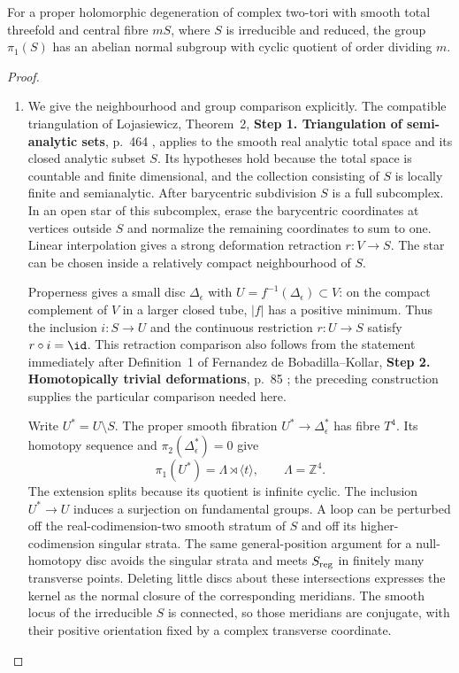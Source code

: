 \begin{proposition}[P4R.1]\hypertarget{tag-02Y2}{}\label{night:P4R.1}\label{stmt:P4R.1}

For a proper holomorphic degeneration of complex two-tori with
smooth total threefold and central fibre $mS$, where $S$ is
irreducible and reduced, the group $\pi_1(S)$ has an abelian
normal subgroup with cyclic quotient of order dividing $m$.
\end{proposition}
\begin{proof}
\begin{enumerate}[label={$\langle1\rangle$\arabic*.},leftmargin=*]
\item 
We give the neighbourhood and group comparison explicitly.
The compatible triangulation of Lojasiewicz, Theorem~2,
\noindent\textbf{Step 1. Triangulation of semi-analytic sets}, p.~464 \cite{Lojasiewicz1964}, applies to
the smooth real analytic total space and its closed analytic
subset $S$. Its hypotheses hold because the total space is
countable and finite dimensional, and the collection consisting
of $S$ is locally finite and semianalytic. After barycentric
subdivision $S$ is a full subcomplex. In an open star of this
subcomplex, erase the barycentric coordinates at vertices
outside $S$ and normalize the remaining coordinates to sum
to one. Linear interpolation gives a strong deformation
retraction $r:V\to S$. The star can be chosen inside a
relatively compact neighbourhood of $S$.

Properness gives a small disc $\Delta_\epsilon$ with
$U=f^{-1}(\Delta_\epsilon)\subset V$: on the compact
complement of $V$ in a larger closed tube, $|f|$ has a
positive minimum. Thus the inclusion $i:S\to U$ and the
continuous restriction $r:U\to S$ satisfy $r\circ i=\id$.
This retraction comparison also follows from the statement
immediately after Definition~1 of Fernandez de Bobadilla--Kollar,
\noindent\textbf{Step 2. Homotopically trivial deformations}, p.~85 \cite{BobadillaKollar2012}; the preceding
construction supplies the particular comparison needed here.

Write $U^*=U\setminus S$. The proper smooth fibration
$U^*\to\Delta_\epsilon^*$ has fibre $T^4$. Its homotopy
sequence and $\pi_2(\Delta_\epsilon^*)=0$ give
\[
 \pi_1(U^*)=\Lambda\rtimes\langle t\rangle,
 \qquad \Lambda=\mathbb Z^4.
\]
The extension splits because its quotient is infinite cyclic.
The inclusion $U^*\to U$ induces a surjection on fundamental
groups. A loop can be perturbed off the real-codimension-two
smooth stratum of $S$ and off its higher-codimension singular
strata. The same general-position argument for a null-homotopy
disc avoids the singular strata and meets $S_{\rm reg}$ in
finitely many transverse points. Deleting little discs about
these intersections expresses the kernel as the normal closure
of the corresponding meridians. The smooth locus of the
irreducible $S$ is connected, so those meridians are conjugate,
with their positive orientation fixed by a complex transverse
coordinate.


\end{enumerate}
\end{proof}
